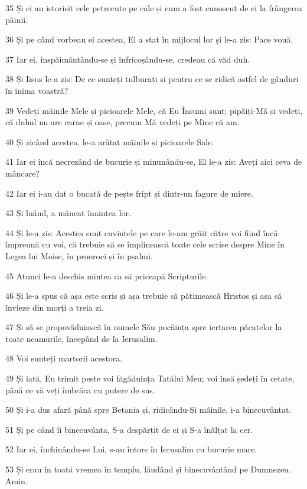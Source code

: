 \par 35 Și ei au istorisit cele petrecute pe cale și cum a fost cunoscut de ei la frângerea pâinii.
\par 36 Și pe când vorbeau ei acestea, El a stat în mijlocul lor și le-a zis: Pace vouă.
\par 37 Iar ei, înspăimântându-se și înfricoșându-se, credeau că văd duh.
\par 38 Și Iisus le-a zis: De ce sunteți tulburați și pentru ce se ridică astfel de gânduri în inima voastră?
\par 39 Vedeți mâinile Mele și picioarele Mele, că Eu Însumi sunt; pipăiți-Mă și vedeți, că duhul nu are carne și oase, precum Mă vedeți pe Mine că am.
\par 40 Și zicând acestea, le-a arătat mâinile și picioarele Sale.
\par 41 Iar ei încă necrezând de bucurie și minunându-se, El le-a zis: Aveți aici ceva de mâncare?
\par 42 Iar ei i-au dat o bucată de pește fript și dintr-un fagure de miere.
\par 43 Și luând, a mâncat înaintea lor.
\par 44 Și le-a zis: Acestea sunt cuvintele pe care le-am grăit către voi fiind încă împreună cu voi, că trebuie să se împlinească toate cele scrise despre Mine în Legea lui Moise, în prooroci și în psalmi.
\par 45 Atunci le-a deschis mintea ca să priceapă Scripturile.
\par 46 Și le-a spus că așa este scris și așa trebuie să pătimească Hristos și așa să învieze din morți a treia zi.
\par 47 Și să se propovăduiască în numele Său pocăința spre iertarea păcatelor la toate neamurile, începând de la Ierusalim.
\par 48 Voi sunteți martorii acestora.
\par 49 Și iată, Eu trimit peste voi făgăduința Tatălui Meu; voi însă ședeți în cetate, până ce vă veți îmbrăca cu putere de sus.
\par 50 Și i-a dus afară până spre Betania și, ridicându-Și mâinile, i-a binecuvântat.
\par 51 Și pe când îi binecuvânta, S-a despărțit de ei și S-a înălțat la cer.
\par 52 Iar ei, închinându-se Lui, s-au întors în Ierusalim cu bucurie mare.
\par 53 Și erau în toată vremea în templu, lăudând și binecuvântând pe Dumnezeu. Amin.


